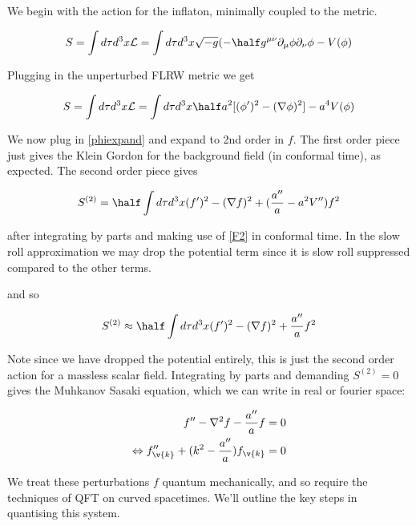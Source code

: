 We begin with the action for the inflaton, minimally coupled to the metric.

\begin{equation}
S =\int d\tau d^3x \mathcal{L}  =  \int d\tau d^3x \sqrt{-g} (-\half g^{\mu \nu}\partial_\mu \phi\partial_\nu \phi - V(\phi)  
\end{equation}

Plugging in the unperturbed FLRW metric we get 


\begin{equation}
S = \int d\tau d^3x \mathcal{L}  = \int d\tau d^3x \half a^2 [(\phi ' )^2 -(\nabla \phi)^2]-a^4V(\phi)
\label{scalarfieldaction}
\end{equation}

We now plug in \ref{phiexpand} and expand to 2nd order in $f$. The first order piece just gives the Klein Gordon for the background field (in conformal time), as expected. The second order piece gives

\begin{equation}
S^{(2)} = \half \int d\tau d^3x (f')^2 - (\nabla f)^2 + (\frac{a''}{a}-a^2V'')f^2
\end{equation}

after integrating by parts and making use of \ref{F2} in conformal time. In the slow roll approximation we may drop the potential term since it is slow roll suppressed compared to the other terms.

and so 

\begin{equation}
S^{(2)} \approx \half \int d\tau d^3x (f')^2 - (\nabla f)^2 + \frac{a''}{a}f^2
\end{equation}

Note since we have dropped the potential entirely, this is just the second order action for a massless scalar field. Integrating by parts and demanding $S^{(2)}=0$ gives the Muhkanov Sasaki equation, which we can write in real or fourier space:

\begin{equation}\begin{split}
f''-\nabla^2f-\frac{a''}{a}f &= 0 \\
\Leftrightarrow f''_{\v{k}} + (k^2-\frac{a''}{a})f_{\v{k}} &= 0
\label{MS}
\end{split}\end{equation}

We treat these perturbations $f$ quantum mechanically, and so require the techniques of QFT on curved spacetimes. We'll outline the key steps in quantising this system.\\

